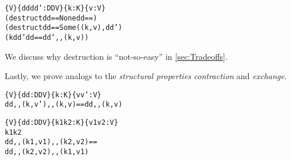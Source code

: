 \begin{theorem}
\label{thm:EzDstr}
\justIndent
\begin{alltt}
  \altFAll\{V\} \{dd dd' : DD V\} \{k : K\} \{v : V\} \altRArr
    (destruct dd == None \altRArr dd == \altEmpty)
      \altAnd
    (destruct dd == Some ((k , v) , dd') \altRArr
      (k \altNIn dd' \altAnd dd == dd' ,, (k , v))
\end{alltt}
\end{theorem}



\noindent
%
We discuss why destruction is ``not-so-easy'' in \autoref{sec:Tradeoffs}.

Lastly, we prove analogs to the \emph{structural properties} \emph{contraction} and \emph{exchange}.


\pagebreak %

\begin{theorem}
\label{thm:cont-dicts}
\justIndent
\begin{alltt}
  \altFAll\{V\} \{dd : DD V\} \{k : K\} \{v v' : V\} \altRArr
    dd ,, (k , v') ,, (k , v) == dd ,, (k , v)
\end{alltt}
\end{theorem}

\begin{theorem}
\label{thm:exch-dicts}
\justIndent
\begin{alltt}
  \altFAll\{V\} \{dd : DD V\} \{k1 k2 : K\} \{v1 v2 : V\} \altRArr
    k1 \altNE k2 \altRArr
    dd ,, (k1 , v1) ,, (k2 , v2) ==
    dd ,, (k2 , v2) ,, (k1 , v1)
\end{alltt}
\end{theorem}
